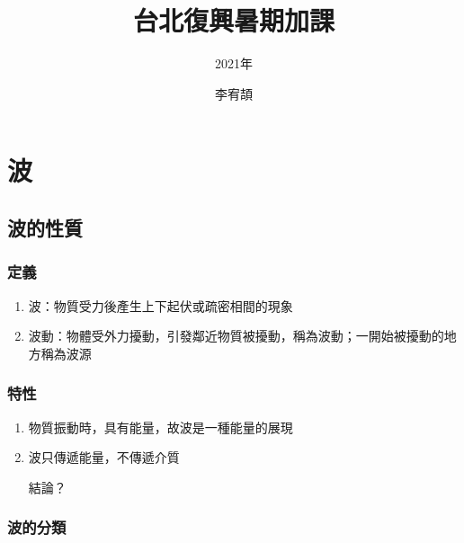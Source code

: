 \documentclass[cn,10pt,math=newtx,chinesefont=founder]{elegantbook}
\title{台北復興暑期加課}
\subtitle{2021年}
\author{李宥頡}
\institute{National Taiwan University}
\begin{document}
\maketitle
\frontmatter
\mainmatter
\chapter{波}
\section{波的性質}
\subsection{定義}
\begin{enumerate}
    \item 波：物質受力後產生上下起伏或疏密相間的現象
    \item 波動：物體受外力擾動，引發鄰近物質被擾動，稱為波動；一開始被擾動的地方稱為波源
\end{enumerate}
\subsection{特性}


\begin{enumerate}
    \item 物質振動時，具有能量，故波是一種能量的展現
    \item 波只傳遞能量，不傳遞介質
    \begin{note}{結論？}
    \end{note}
\end{enumerate}

\subsection{波的分類}
\vspace{25ex}
\end{document}
